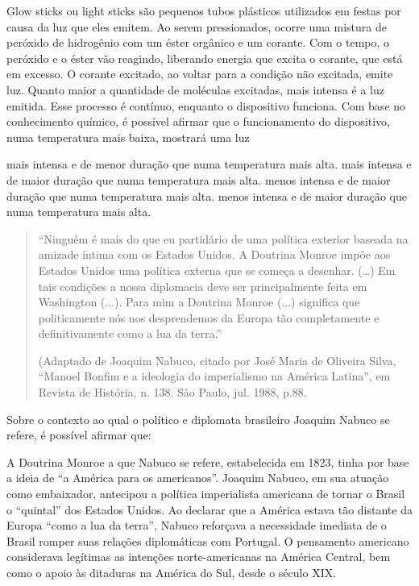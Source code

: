 \documentclass[12pt, answers]{exam}
\begin{document}
\begin{questions}
\question Glow sticks ou light sticks são pequenos tubos plásticos
utilizados em festas por causa da luz que eles emitem. Ao
serem pressionados, ocorre uma mistura de peróxido de
hidrogênio com um éster orgânico e um corante. Com o
tempo, o peróxido e o éster vão reagindo, liberando
energia que excita o corante, que está em excesso. O
corante excitado, ao voltar para a condição não excitada,
emite luz. Quanto maior a quantidade de moléculas
excitadas, mais intensa é a luz emitida. Esse processo é
contínuo, enquanto o dispositivo funciona. Com base no
conhecimento químico, é possível afirmar que o
funcionamento do dispositivo, numa temperatura mais
baixa, mostrará uma luz
\begin{choices}
\choice mais intensa e de menor duração que numa temperatura mais alta.
\choice mais intensa e de maior duração que numa
temperatura mais alta.
\CorrectChoice menos intensa e de maior duração que numa
temperatura mais alta.
\choice menos intensa e de maior duração que numa
temperatura mais alta.
\end{choices}

\question \begin{quote}
``Ninguém é mais do que eu partidário de uma política
exterior baseada na amizade íntima com os Estados
Unidos. A Doutrina Monroe impõe aos Estados Unidos
uma política externa que se começa a desenhar. (…) Em
tais condições a nossa diplomacia deve ser principalmente
feita em Washington (...). Para mim a Doutrina Monroe
(...) significa que politicamente nós nos desprendemos da
Europa tão completamente e definitivamente como a lua
da terra.''

\begin{flushright}
(Adaptado de Joaquim Nabuco, citado por José Maria de Oliveira Silva,
``Manoel Bonfim e a ideologia do imperialismo na América Latina'', em
Revista de História, n. 138. São Paulo, jul. 1988, p.88.
\end{flushright}
\end{quote}

Sobre o contexto ao qual o político e diplomata brasileiro
Joaquim Nabuco se refere, é possível afirmar que:
\begin{choices}
\CorrectChoice A Doutrina Monroe a que Nabuco se refere,
estabelecida em 1823, tinha por base a ideia de ``a
América para os americanos''.
\choice Joaquim Nabuco, em sua atuação como embaixador,
antecipou a política imperialista americana de tornar o
Brasil o ``quintal'' dos Estados Unidos.
\choice Ao declarar que a América estava tão distante da
Europa ``como a lua da terra'', Nabuco reforçava a
necessidade imediata de o Brasil romper suas relações
diplomáticas com Portugal.
\choice O pensamento americano considerava legítimas as
intenções norte-americanas na América Central, bem
como o apoio às ditaduras na América do Sul, desde o
século XIX.
\end{choices}
\end{questions}
\end{document}

